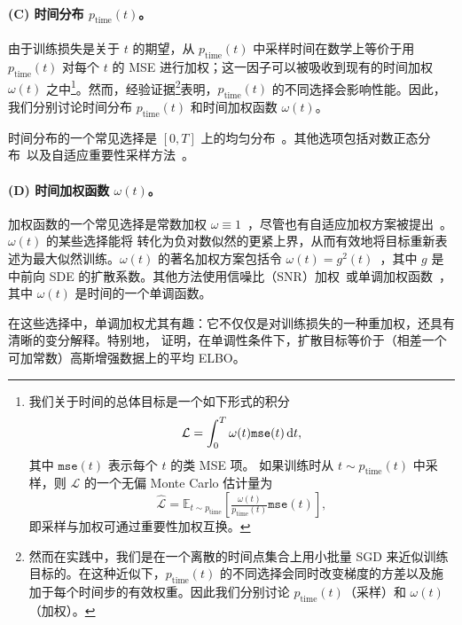 \paragraph{(C) 时间分布 $p_{\text{time}}(t)$。} 由于训练损失是关于 $t$ 的期望，从 $p_{\mathrm{time}}(t)$ 中采样时间在数学上等价于用 $p_{\mathrm{time}}(t)$ 对每个 $t$ 的 MSE 进行加权；这一因子可以被吸收到现有的时间加权 $\omega(t)$ 之中\footnote{我们关于时间的总体目标是一个如下形式的积分
\[
\mathcal{L} = \int_{0}^{T} \omega(t)\mathtt{mse}(t)\mathop{}\!\mathrm{d} t,
\]
其中 $\mathtt{mse}(t)$ 表示每个 $t$ 的类 MSE 项。
如果训练时从 $t\sim p_{\mathrm{time}}(t)$ 中采样，则 $\mathcal{L}$ 的一个无偏 Monte Carlo 估计量为
\[
\widehat{\mathcal{L}} = \mathbb{E}_{t\sim p_{\mathrm{time}}} \left[ \tfrac{\omega(t)}{p_{\mathrm{time}}(t)} \mathtt{mse}(t) \right],
\]
即采样与加权可通过重要性加权互换。}。然而，经验证据\footnote{然而在实践中，我们是在一个离散的时间点集合上用小批量 SGD 来近似训练目标的。在这种近似下，$p_{\mathrm{time}}(t)$ 的不同选择会同时改变梯度的方差以及施加于每个时间步的有效权重。因此我们分别讨论 $p_{\mathrm{time}}(t)$（采样）和 $\omega(t)$（加权）。}表明，$p_{\mathrm{time}}(t)$ 的不同选择会影响性能。因此，我们分别讨论时间分布 $p_{\mathrm{time}}(t)$ 和时间加权函数 $\omega(t)$。

时间分布的一个常见选择是 $[0,T]$ 上的均匀分布~\citep{ho2020denoising,song2020score,lipman2022flow,liu2022rectified}。其他选项包括对数正态分布~\citep{karras2022elucidating}以及自适应重要性采样方法~\citep{song2021maximum,kingma2021variational}。



\paragraph{(D) 时间加权函数 $\omega(t)$。} 加权函数的一个常见选择是常数加权 $\omega \equiv 1$~\citep{ho2020denoising,karras2022elucidating,lipman2022flow,liu2022rectified}，尽管也有自适应加权方案被提出~\citep{karras2023analyzing}。$\omega(t)$ 的某些选择能将  转化为负对数似然的更紧上界，从而有效地将目标重新表述为最大似然训练。$\omega(t)$ 的著名加权方案包括令 $\omega(t) = g^2(t)$~\citep{song2021maximum}，其中 $g$ 是  中前向 SDE 的扩散系数。其他方法使用信噪比（SNR）加权~\citep{kingma2021variational}或单调加权函数~\citep{kingma2023understanding}，其中 $\omega(t)$ 是时间的一个单调函数。

在这些选择中，单调加权尤其有趣：它不仅仅是对训练损失的一种重加权，还具有清晰的变分解释。特别地，\citet{kim2022soft,kingma2023understanding} 证明，在单调性条件下，扩散目标等价于（相差一个可加常数）高斯增强数据上的平均 ELBO。

